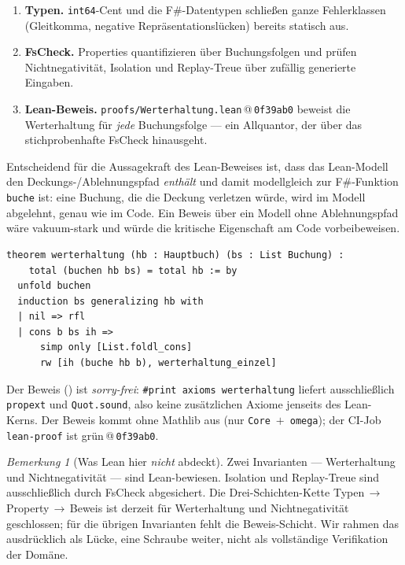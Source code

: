 \documentclass[11pt,a4paper]{article}
\theoremstyle{definition}
\theoremstyle{remark}
\newtheorem{bemerkung}{Bemerkung}[section]
\begin{document}
\begin{enumerate}
  \item \textbf{Typen.} \texttt{int64}-Cent und die F\#-Datentypen schließen ganze
  Fehlerklassen (Gleitkomma, negative Repräsentationslücken) bereits statisch aus.
  \item \textbf{FsCheck.} Properties quantifizieren über Buchungsfolgen und prüfen
  Nichtnegativität, Isolation und Replay-Treue über zufällig generierte Eingaben.
  \item \textbf{Lean-Beweis.} \texttt{proofs/Werterhaltung.lean}\,@\,\texttt{0f39ab0} beweist die
  Werterhaltung für \emph{jede} Buchungsfolge --- ein Allquantor, der über das stichprobenhafte
  FsCheck hinausgeht.
\end{enumerate}

Entscheidend für die Aussagekraft des Lean-Beweises ist, dass das Lean-Modell den
Deckungs-/Ablehnungspfad \emph{enthält} und damit modellgleich zur F\#-Funktion \texttt{buche}
ist: eine Buchung, die die Deckung verletzen würde, wird im Modell abgelehnt, genau wie im Code.
Ein Beweis über ein Modell ohne Ablehnungspfad wäre vakuum-stark und würde die kritische
Eigenschaft am Code vorbeibeweisen.

\begin{lstlisting}[language=lean,caption={Kern-Theorem in \texttt{proofs/Werterhaltung.lean}\,@\,\texttt{0f39ab0} (verbatim; Definitionen und das Lemma \texttt{werterhaltung\_einzel} im Repo)},label={lst:werterhaltung}]
theorem werterhaltung (hb : Hauptbuch) (bs : List Buchung) :
    total (buchen hb bs) = total hb := by
  unfold buchen
  induction bs generalizing hb with
  | nil => rfl
  | cons b bs ih =>
      simp only [List.foldl_cons]
      rw [ih (buche hb b), werterhaltung_einzel]
\end{lstlisting}

\noindent
Der Beweis () ist \emph{sorry-frei}: \texttt{\#print axioms werterhaltung} liefert ausschließlich
\texttt{propext} und \texttt{Quot.sound}, also keine zusätzlichen Axiome jenseits des
Lean-Kerns. Der Beweis kommt ohne Mathlib aus (nur \texttt{Core}~$+$~\texttt{omega}); der
CI-Job \texttt{lean-proof} ist grün\,@\,\texttt{0f39ab0}.

\begin{bemerkung}[Was Lean hier \emph{nicht} abdeckt]
\label{bem:ledger-nur-werterhaltung}
Zwei Invarianten --- Werterhaltung und Nichtnegativität --- sind Lean-bewiesen.
Isolation und Replay-Treue sind ausschließlich durch FsCheck abgesichert. Die
Drei-Schichten-Kette Typen\,$\rightarrow$\,Property\,$\rightarrow$\,Beweis ist derzeit für
Werterhaltung und Nichtnegativität geschlossen; für die übrigen Invarianten fehlt die Beweis-Schicht. Wir rahmen
das ausdrücklich als Lücke, eine Schraube weiter, nicht als vollständige Verifikation der
Domäne.
\end{bemerkung}
\end{document}
